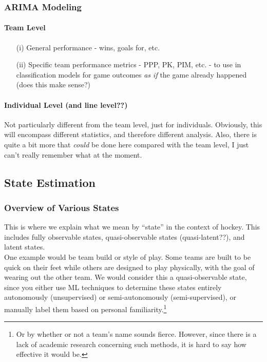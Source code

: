\documentclass{notes}
\begin{document}
      \subsubsection{ARIMA Modeling}

        \paragraph{Team Level}

          \begin{itemize}
            \item[(i)] General performance - wins, goals for, etc.

            \item[(ii)] Specific team performance metrics - PPP, PK, PIM, etc. - to use in classification models for game outcomes \emph{as if} the game already happened (does this make sense?)

          \end{itemize}

        \paragraph{Individual Level (and line level??)}\hfill

          Not particularly different from the team level, just for individuals.
          Obviously, this will encompass different statistics, and therefore different analysis.
          Also, there is quite a bit more that \emph{could} be done here compared with the team level, I just can't really remember what at the moment.


    \subsection{State Estimation}

        \subsubsection{Overview of Various States}
          This is where we explain what we mean by ``state'' in the context of hockey.
          This includes fully observable states, quasi-observable states (quasi-latent??), and latent states.\\

          One example would be team build or style of play.
          Some teams are built to be quick on their feet while others are designed to play physically, with the goal of wearing out the other team.
          We would consider this a quasi-observable state, since you either use ML techniques to determine these states entirely autonomously (unsupervised) or semi-autonomously (semi-supervised), or manually label them based on personal familiarity.\footnote{Or by whether or not a team's name sounds fierce. However, since there is a lack of academic research concerning such methods, it is hard to say how effective it would be.}
\end{document}
